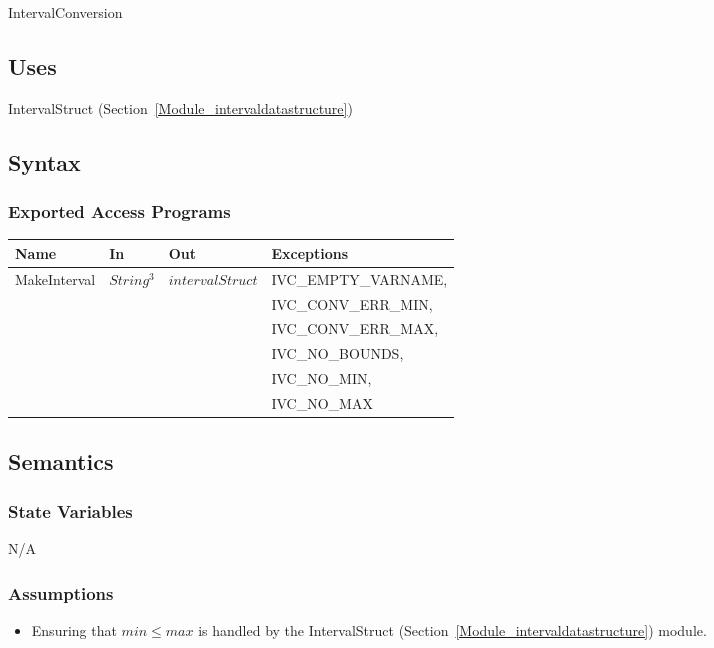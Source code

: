 \documentclass[12pt, titlepage]{article}
\begin{document}
IntervalConversion

\subsection{Uses}

IntervalStruct (Section~\ref{Module_intervaldatastructure})

\subsection{Syntax}

\subsubsection{Exported Access Programs}

\begin{center}
	\begin{tabular}{p{3cm} p{2.3cm} p{3cm} p{5cm}}
		\hline
		\textbf{Name} & \textbf{In} & \textbf{Out} & \textbf{Exceptions} \\
		\hline
		\multirow{6}{3cm}{MakeInterval} & \multirow{6}{2.3cm}{$String^3$} & 
		\multirow{6}{3cm}{$intervalStruct$} & IVC\_EMPTY\_VARNAME, \\
		& & & IVC\_CONV\_ERR\_MIN, \\
		& & & IVC\_CONV\_ERR\_MAX, \\
		& & & IVC\_NO\_BOUNDS, \\
		& & & IVC\_NO\_MIN, \\
		& & & IVC\_NO\_MAX\\
		\hline
	\end{tabular}
\end{center}

\subsection{Semantics}

\subsubsection{State Variables}

N/A

\subsubsection{Assumptions}

\begin{itemize}
	\item Ensuring that $min \leq max$ is handled by the IntervalStruct 
	(Section~\ref{Module_intervaldatastructure}) module.
\end{itemize}
\end{document}
